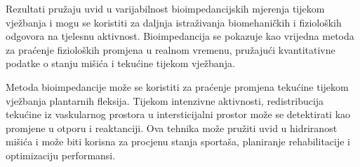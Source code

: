 \documentclass[../diplomski_rad.tex]{subfiles}
\begin{document}
\sloppy

\justifying

Rezultati pružaju uvid u varijabilnost bioimpedancijskih mjerenja tijekom vježbanja i mogu se 
koristiti za daljnja istraživanja biomehaničkih i fizioloških odgovora na tjelesnu aktivnost. 
Bioimpedancija se pokazuje kao vrijedna metoda za praćenje fizioloških promjena u realnom vremenu, 
pružajući kvantitativne podatke o stanju mišića i tekućine tijekom vježbanja.

Metoda bioimpedancije može se koristiti za praćenje promjena tekućine tijekom vježbanja plantarnih fleksija. 
Tijekom intenzivne aktivnosti, redistribucija tekućine iz vaskularnog prostora u intersticijalni prostor 
može se detektirati kao promjene u otporu i reaktanciji. 
Ova tehnika može pružiti uvid u hidriranost mišića i može biti korisna za procjenu stanja sportaša, 
planiranje rehabilitacije i optimizaciju performansi.
\end{document}
